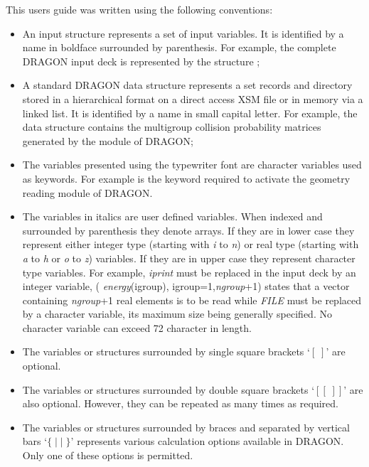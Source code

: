 This users guide was written using the following conventions:

\begin{itemize}

\item An input structure represents a set of input variables. It is identified
by a name in boldface surrounded by parenthesis. For example, the complete
DRAGON input deck is represented by the structure ;

\item A standard DRAGON data structure represents a set records and directory
stored in a hierarchical format on a direct access
XSM file or in memory via a linked list.\cite{DragonDataStructures} It is
identified by a name in small capital letter.
For example, the data structure  contains the multigroup collision
probability matrices generated by the  module of DRAGON;

\item The variables presented using the typewriter font are character
variables used as keywords. For example  is the keyword required to
activate the geometry reading module of DRAGON.

\item The variables in italics are user defined variables. When indexed and
surrounded by parenthesis they denote arrays. If they are in lower case they
represent either integer type  (starting with {\it i} to {\it n}) or real type
(starting with  {\it a} to {\it h} or {\it o} to {\it z}) variables. If they are
in upper case they represent character type variables. For example, {\it iprint}
must be replaced in the input deck by an integer variable,  ({\it
energy}(igroup), igroup=1,{\it ngroup}+1) states that a vector containing {\it
ngroup}+1 real elements is to be read while {\it FILE} must be replaced by a
character variable, its maximum size being generally specified. 
No character variable can exceed 72 character in length.

\item The variables or structures surrounded by single square brackets `$[\;]$'
are optional.

\item The variables or structures surrounded by double square brackets
`$[[\;]]$' are also optional. However, they can be repeated as many times
as required.

\item The variables or structures surrounded by braces and separated by vertical
bars `$\{\; |\; |\; \}$' represents various calculation options available
in DRAGON. Only one of these options is permitted.

\end{itemize}

